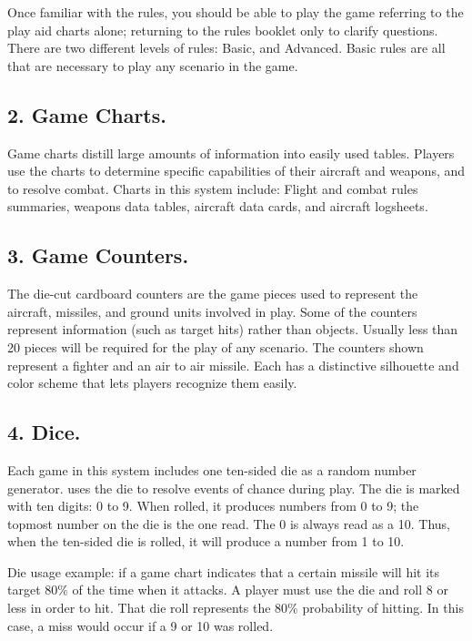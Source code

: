Once familiar with the rules, you should be able to play the game referring to the play aid charts alone; returning to the rules booklet only to clarify questions. There are two different levels of rules: Basic, and Advanced. Basic rules are all that are necessary to play any scenario in the game.

\subsection{2. Game Charts.} Game charts distill large amounts of information into easily used tables. Players use the charts to determine specific capabilities of their aircraft and weapons, and to resolve combat. Charts in this system include: Flight and combat rules summaries, weapons data tables, aircraft data cards, and aircraft logsheets.

\subsection{3. Game Counters.} The die-cut cardboard counters are the game pieces used to represent the aircraft, missiles, and ground units involved in play. Some of the counters represent information (such as target hits) rather than objects. Usually less than 20 pieces will be required for the play of any scenario. The counters shown  represent a fighter and an air to air missile. Each has a distinctive silhouette and color scheme that lets players recognize them easily.



\subsection{4. Dice.} Each game in this system includes one ten-sided die as a random number generator. {\AirPow} uses the die to resolve events of chance during play. The die is marked with ten digits: 0 to 9. When rolled, it produces numbers from 0 to 9; the topmost number on the die is the one read. The 0 is always read as a 10. Thus, when the ten-sided die is rolled, it will produce a number from 1 to 10.

Die usage example: if a game chart indicates that a certain missile will hit its target 80\% of the time when it attacks. A player must use the die and roll 8 or less in order to hit. That die roll represents the 80\% probability of hitting. In this case, a miss would occur if a 9 or 10 was rolled.

